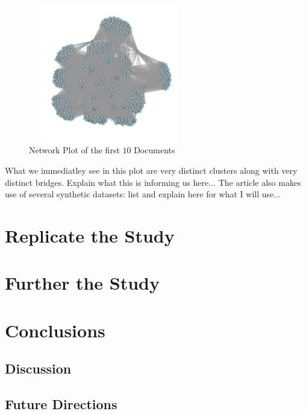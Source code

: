 \documentclass[12pt,times]{elsarticle}
\begin{document}
\begin{figure}[h!]
	\centering
	\includegraphics[width=70mm,height=60mm]{Images/simple_plot.pdf}
	\caption{Network Plot of the first $10$ Documents \label{fig.1}}
\end{figure} 

What we immediatley see in this plot are very distinct clusters along with very distinct bridges. Explain what this is informing us here...
The article also makes use of several synthetic datasets: list and explain here for what I will use...

\section{Replicate the Study}
\vspace{-4mm}


\section{Further the Study}
\vspace{-4mm}


\section{Conclusions}
\vspace{-4mm}
\subsection{Discussion}
\vspace{-2mm}

\subsection{Future Directions}
\vspace{-2mm}
\end{document}
